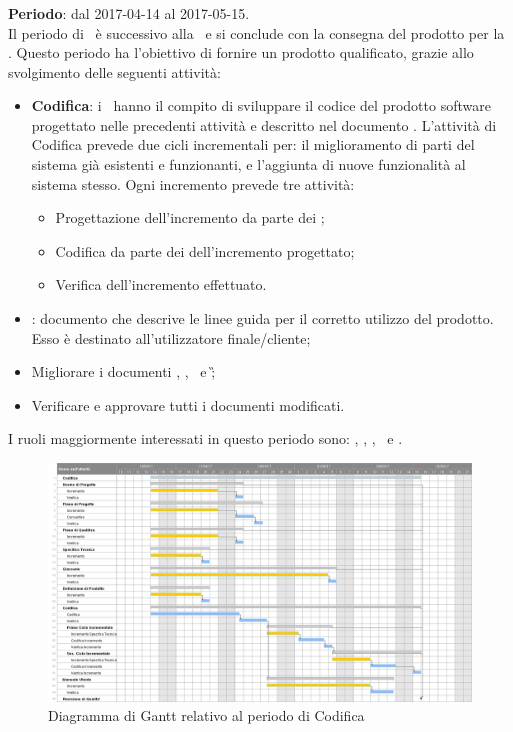 		\subsubsection{\CO}
		\textbf{Periodo}: dal 2017-04-14 al 2017-05-15.\\
		Il periodo di \CO\ è successivo alla \PD\ e si conclude con la consegna del prodotto per la \RQ. Questo periodo ha l'obiettivo di fornire un prodotto qualificato, grazie allo svolgimento delle seguenti attività:
		\begin{itemize}
			\item \textbf{Codifica}: i \textit{\Progrs}\ hanno il compito di sviluppare il codice del prodotto software progettato nelle precedenti attività e descritto nel documento \DDP. L’attività di Codifica prevede due cicli incrementali per: il miglioramento
			di parti del sistema già esistenti e funzionanti, e l’aggiunta di nuove funzionalità al sistema stesso.
			Ogni incremento prevede tre attività:
			\begin{itemize}
				\item Progettazione dell’incremento da parte dei \textit{\Progs};
				\item Codifica da parte dei \textit{\Progrs} dell’incremento progettato;
				\item Verifica dell’incremento effettuato.
			\end{itemize}
			\item \textit{\MU}: documento che descrive le linee guida per il corretto utilizzo del prodotto. Esso è destinato all’utilizzatore finale/cliente;
			\item  Migliorare i documenti \NdP, \PdP, \PdQ\ e \G;
			\item Verificare e approvare tutti i documenti modificati.
		\end{itemize}
		I ruoli maggiormente interessati in questo periodo sono: \textit{\Amm}, \textit{\Res}, \textit{\Prog}, \textit{\Progr}\ e \textit{\Ver}.
		
		\begin{figure}[H]
			\centering
			\includegraphics[scale=0.32]{img/ganttnetbreak5.png}
			\caption{Diagramma di Gantt relativo al periodo di Codifica}
		\end{figure}
		

